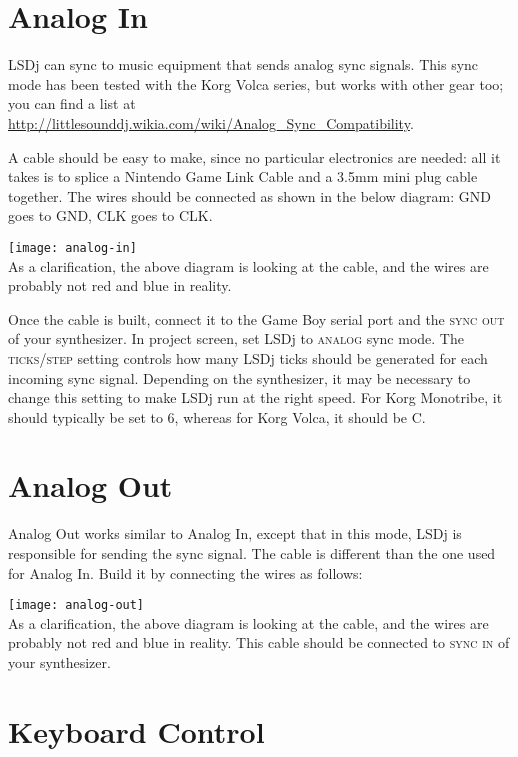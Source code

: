 \section{Analog In}

LSDj can sync to music equipment that sends analog sync signals. This sync mode has been tested with the Korg Volca series, but works with other gear too; you can find a list at \url{http://littlesounddj.wikia.com/wiki/Analog_Sync_Compatibility}.

A cable should be easy to make, since no particular electronics are needed: all it takes is to splice a Nintendo Game Link Cable and a 3.5mm mini plug cable together. The wires should be connected as shown in the below diagram: GND goes to GND, CLK goes to CLK.

\texttt{[image: analog-in]}\\

As a clarification, the above diagram is looking at the cable, and the wires are probably not red and blue in reality.

Once the cable is built, connect it to the Game Boy serial port and the \textsc{sync out} of your synthesizer. In project screen, set LSDj to \textsc{analog} sync mode. The \textsc{ticks/step} setting controls how many LSDj ticks should be generated for each incoming sync signal. Depending on the synthesizer, it may be necessary to change this setting to make LSDj run at the right speed. For Korg Monotribe, it should typically be set to 6, whereas for Korg Volca, it should be C.

\section{Analog Out}

Analog Out works similar to Analog In, except that in this mode, LSDj is responsible for sending the sync signal. The cable is different than the one used for Analog In. Build it by connecting the wires as follows:

\texttt{[image: analog-out]}\\

As a clarification, the above diagram is looking at the cable, and the wires are probably not red and blue in reality. This cable should be connected to \textsc{sync in} of your synthesizer.

\section{Keyboard Control}

